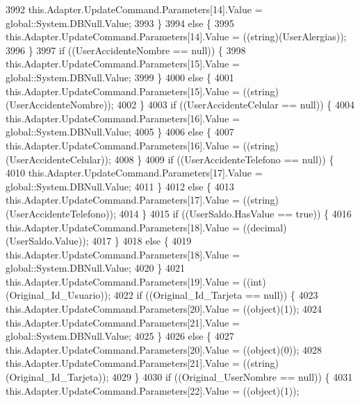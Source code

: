 \begin{DoxyCode}
3992                 this.Adapter.UpdateCommand.Parameters[14].Value = global::System.DBNull.Value;
3993             \}
3994             \textcolor{keywordflow}{else} \{
3995                 this.Adapter.UpdateCommand.Parameters[14].Value = ((string)(UserAlergias));
3996             \}
3997             \textcolor{keywordflow}{if} ((UserAccidenteNombre == null)) \{
3998                 this.Adapter.UpdateCommand.Parameters[15].Value = global::System.DBNull.Value;
3999             \}
4000             \textcolor{keywordflow}{else} \{
4001                 this.Adapter.UpdateCommand.Parameters[15].Value = ((string)(UserAccidenteNombre));
4002             \}
4003             \textcolor{keywordflow}{if} ((UserAccidenteCelular == null)) \{
4004                 this.Adapter.UpdateCommand.Parameters[16].Value = global::System.DBNull.Value;
4005             \}
4006             \textcolor{keywordflow}{else} \{
4007                 this.Adapter.UpdateCommand.Parameters[16].Value = ((string)(UserAccidenteCelular));
4008             \}
4009             \textcolor{keywordflow}{if} ((UserAccidenteTelefono == null)) \{
4010                 this.Adapter.UpdateCommand.Parameters[17].Value = global::System.DBNull.Value;
4011             \}
4012             \textcolor{keywordflow}{else} \{
4013                 this.Adapter.UpdateCommand.Parameters[17].Value = ((string)(UserAccidenteTelefono));
4014             \}
4015             \textcolor{keywordflow}{if} ((UserSaldo.HasValue == \textcolor{keyword}{true})) \{
4016                 this.Adapter.UpdateCommand.Parameters[18].Value = ((decimal)(UserSaldo.Value));
4017             \}
4018             \textcolor{keywordflow}{else} \{
4019                 this.Adapter.UpdateCommand.Parameters[18].Value = global::System.DBNull.Value;
4020             \}
4021             this.Adapter.UpdateCommand.Parameters[19].Value = ((int)(Original\_Id\_Usuario));
4022             \textcolor{keywordflow}{if} ((Original\_Id\_Tarjeta == null)) \{
4023                 this.Adapter.UpdateCommand.Parameters[20].Value = ((object)(1));
4024                 this.Adapter.UpdateCommand.Parameters[21].Value = global::System.DBNull.Value;
4025             \}
4026             \textcolor{keywordflow}{else} \{
4027                 this.Adapter.UpdateCommand.Parameters[20].Value = ((object)(0));
4028                 this.Adapter.UpdateCommand.Parameters[21].Value = ((string)(Original\_Id\_Tarjeta));
4029             \}
4030             \textcolor{keywordflow}{if} ((Original\_UserNombre == null)) \{
4031                 this.Adapter.UpdateCommand.Parameters[22].Value = ((object)(1));

\end{DoxyCode}
